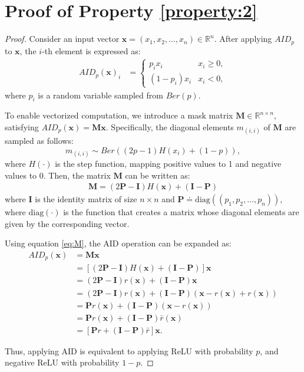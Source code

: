 

\section{Proof of Property \ref{property:2}}
\label{app:proof_property_2}
\begin{proof}
Consider an input vector $\mathbf{x} = (x_1, x_2, \dots, x_n) \in \mathbb{R}^n$.
After applying $AID_p$ to $\mathbf{x}$, the $i$-th element is expressed as:
\begin{align*}
AID_p(\mathbf{x})_i 
&= 
\begin{cases}
    p_{i} x_i & x_i \geq 0, \\
    (1-p_{i}) x_i & x_i < 0,
\end{cases}
\end{align*}
where $p_{i}$ is a random variable sampled from $Ber(p)$.

To enable vectorized computation, we introduce a mask matrix $\mathbf{M} \in \mathbb{R}^{n \times n}$, satisfying $AID_p(\mathbf{x}) = \mathbf{M} \mathbf{x}$.
Specifically, the diagonal elements $m_{(i,i)}$ of $\mathbf{M}$ are sampled as follows:
\[
m_{(i,i)} \sim Ber((2p-1)H(x_i) + (1-p)),
\]
where $H(\cdot)$ is the step function, mapping positive values to 1 and negative values to 0. Then, the matrix $\mathbf{M}$ can be written as:
\begin{align}
    \mathbf{M} = (2\mathbf{P} - \mathbf{I}) H(\mathbf{x}) + (\mathbf{I} - \mathbf{P}) 
    \label{eq:M}
\end{align}
where $\mathbf{I}$ is the identity matrix of size $n \times n$ and $\mathbf{P} \doteq \text{diag}((p_1, p_2, \dots, p_n))$, where $\text{diag}(\cdot)$ is the function that creates a matrix whose diagonal elements are given by the corresponding vector.


Using equation \ref{eq:M}, the AID operation can be expanded as:
\begin{align}
AID_p(\mathbf{x}) &= \mathbf{M} \mathbf{x} \nonumber\\
&= [(2\mathbf{P} - \mathbf{I}) H(\mathbf{x}) + (\mathbf{I} - \mathbf{P})] \mathbf{x} \nonumber\\
&= (2\mathbf{P} - \mathbf{I}) r(\mathbf{x}) + (\mathbf{I} - \mathbf{P}) \mathbf{x} \label{eq:AID_expansion} \\
&= (2\mathbf{P} - \mathbf{I}) r(\mathbf{x}) + (\mathbf{I} - \mathbf{P}) (\mathbf{x} - r(\mathbf{x}) + r(\mathbf{x})) \nonumber\\
&= \mathbf{P} r(\mathbf{x}) + (\mathbf{I} - \mathbf{P}) (\mathbf{x} - r(\mathbf{x})) \nonumber\\
&= \mathbf{P} r(\mathbf{x}) + (\mathbf{I} - \mathbf{P}) \bar{r}(\mathbf{x}) \nonumber\\
&= [\mathbf{P} r + (\mathbf{I} - \mathbf{P}) \bar{r}] \mathbf{x}.\nonumber
\end{align}

Thus, applying AID is equivalent to applying ReLU with probability $p$, and negative ReLU with probability $1-p$.
\end{proof}

